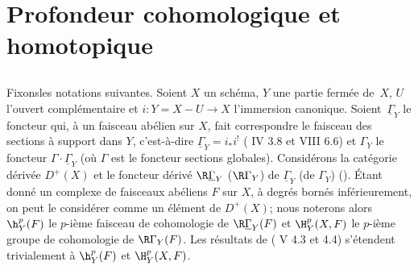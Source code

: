 \section{Profondeur cohomologique et homotopique}\label{XIV.1}

\setcounter{subsection}{-1}

\subsection{}\label{XIV.1.0}
Fixons\pageoriginale les notations suivantes. Soient $X$ un sch\'ema, $Y$ une partie ferm\'ee de~$X$, $U$ l'ouvert compl\'ementaire et $i:Y=X-U\to X$ l'immersion canonique. Soient~$\underline{\Gamma}_Y$ le foncteur qui, \`a un faisceau ab\'elien sur $X$, fait correspondre le \og faisceau des sections \`a support dans $Y$\fg, c'est-\`a-dire $\underline{\Gamma}_Y=i_*i^!$ (\cf {} IV 3.8 et VIII 6.6) et $\Gamma_Y$ le foncteur $\Gamma\cdot \underline{\Gamma}_Y$ (o\`u $\Gamma$ est le foncteur \og sections globales{\fg}). Consid\'erons la cat\'egorie d\'eriv\'ee $D^+(X)$ et le foncteur d\'eriv\'e $\R\underline{\Gamma}_Y$ (\resp $\R\Gamma_Y$) de $\underline{\Gamma}_Y$ (\resp de $\Gamma_Y$) (\cf \cite{XIV.3}). \'Etant donn\'e un complexe de faisceaux ab\'eliens $F$ sur $X$, \`a degr\'es born\'es inf\'erieurement, on peut le consid\'erer comme un \'el\'ement de $D^+(X)$; nous noterons alors ${\h}_Y^p(F)$ le $p$-i\`eme faisceau de cohomologie de $\R\underline{\Gamma}_Y(F)$ et $\H_Y^p(X, F)$ le $p$-i\`eme groupe de cohomologie de $\R\Gamma_Y(F)$. Les r\'esultats de ( V 4.3 et 4.4) s'\'etendent trivialement \`a ${\h}_Y^p(F)$ et $\H_Y^p(X, F)$.

